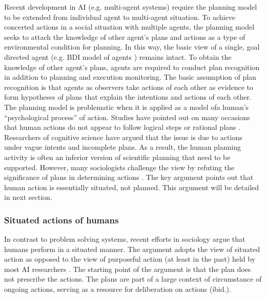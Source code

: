 Recent development in \ac{AI} (e.g. multi-agent systems) require the planning model to be extended from individual agent to multi-agent situation. To achieve concerted actions in a social situation with multiple agents, the planning model seeks to attach the knowledge of other agent's plans and actions as a type of environmental condition for planning. In this way, the basic view of a single, goal directed agent (e.g. BDI model of agents \citep{Georgeff1999}) remains intact. To obtain the knowledge of other agent's plans, agents are required to conduct plan recognition in addition to planning and execution monitoring. The basic assumption of plan recognition is that agents as observers take actions of each other as evidence to form hypotheses of plans that explain the intentions and actions of each other.  \\

The planning model is problematic when it is applied as a model ofa  human's ``psychological process'' of action. Studies have pointed out on many occasions that human actions do not appear to follow logical steps or rational plans \citep{Suchman1987}. Researchers of cognitive science have argued that the issue is due to actions under vague intents and incomplete plans. As a result, the human planning activity is often an inferior version of scientific planning that need to be supported. However, many sociologists challenge the view by refuting the significance of plans in determining actions  \citep{Suchman1987}. The key argument points out that human action is essentially situated, not planned. This argument will be detailed in next section.\\ 

\subsubsection{Situated actions of humans}
In contrast to problem solving systems, recent efforts in sociology argue that humans perform in a situated manner. The argument adopts the view of situated action as opposed to the view of purposeful action (at least in the past) held by most \ac{AI} researchers \citep{Suchman1987}. The starting point of the argument is that the plan does not prescribe the actions. The plans are part of a large context of circumstance of ongoing actions, serving as a resource for deliberation on actions (ibid.).\\

